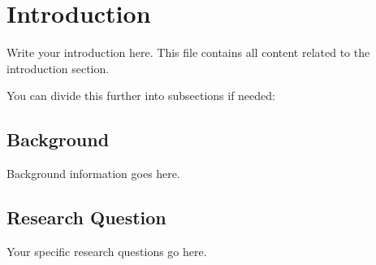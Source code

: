 \section{Introduction}
\label{sec:introduction}

Write your introduction here. This file contains all content related to the introduction section.

You can divide this further into subsections if needed:

\subsection{Background}
Background information goes here.

\subsection{Research Question}
Your specific research questions go here.